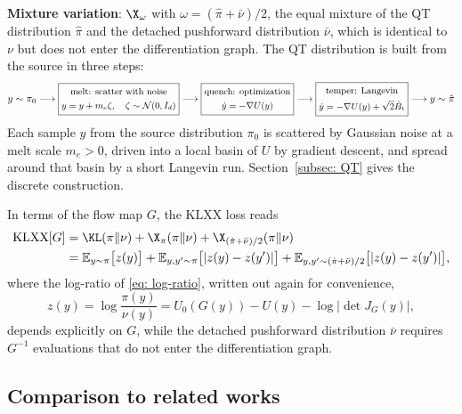\documentclass{article}
\begin{document}
\textbf{Mixture variation}: $\X_\omega$ with $\omega = (\hat\pi + \bar\nu)/2$, the equal mixture of the QT distribution $\hat\pi$ and the detached pushforward distribution $\bar\nu$, which is identical to $\nu$ but does not enter the differentiation graph. The QT distribution is built from the source in three steps:
	\begin{equation*}
		y\sim \pi_0 \longrightarrow \boxed{\small
		\begin{gathered}
			\text{melt: scatter with noise} \\
			y = y + m_e \zeta, \quad \zeta \sim \mathcal N(0,I_d)
		\end{gathered}
		} \longrightarrow \boxed{\small
		\begin{gathered}
			\text{quench: optimization} \\
			\dot y = -\nabla U(y)
		\end{gathered}
		} \longrightarrow \boxed{\small
		\begin{gathered}
			\text{temper: Langevin} \\
			\dot y = -\nabla U(y) + \sqrt{2}\dot B_t
		\end{gathered}
		} \longrightarrow y\sim \hat \pi
	\end{equation*}
Each sample $y$ from the source distribution $\pi_0$ is scattered by Gaussian noise at a melt scale $m_e>0$, driven into a local basin of $U$ by gradient descent, and spread around that basin by a short Langevin run. Section~\ref{subsec: QT} gives the discrete construction.

In terms of the flow map $G$, the KLXX loss reads
\begin{align}
	\mathrm{KLXX}[G] & = \KL(\pi\|\nu) + \X_\pi(\pi\|\nu) + \X_{(\hat\pi+\bar\nu)/2}(\pi\|\nu) \notag \\
	& = \mathbb E_{y\sim\pi}\big[z(y)\big] + \mathbb E_{y,y'\sim\pi}\big[|z(y)-z(y')|\big] + \mathbb E_{y,y'\sim(\hat\pi+\bar\nu)/2}\big[|z(y)-z(y')|\big],
	\label{eq: KLXX-G}
\end{align}
where the log-ratio of \eqref{eq: log-ratio}, written out again for convenience,
\begin{equation*}
	z(y) = \log\frac{\pi(y)}{\nu(y)} = U_0(G(y)) - U(y) - \log|\det J_G(y)| ,
\end{equation*}
depends explicitly on $G$, while the detached pushforward distribution $\bar\nu$ requires $G^{-1}$ evaluations that do not enter the differentiation graph.

\subsection{Comparison to related works}
\label{subsec: loss-related}
\end{document}
